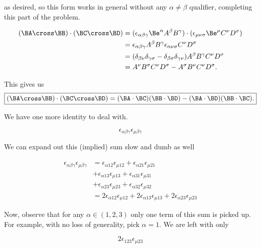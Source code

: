 as desired, so this form works in general without any $\alpha \ne \beta$ qualifier, completing this part of the problem.

\begin{align*}
(\BA \cross \BB) \cdot (\BC \cross \BD)
&=
(\epsilon_{\alpha \beta \gamma} \Be^\alpha A^\beta B^\gamma ) \cdot
(\epsilon_{\mu \nu \sigma} \Be^\mu C^\nu D^\sigma ) \\
&=
\epsilon_{\alpha \beta \gamma} A^\beta B^\gamma
\epsilon_{\alpha \nu \sigma} C^\nu D^\sigma \\
&=
(
\delta_{\beta \nu} \delta_{\gamma\sigma}
-\delta_{\beta \sigma} \delta_{\gamma\nu} )
A^\beta B^\gamma
C^\nu D^\sigma \\
&=
A^\nu B^\sigma
C^\nu D^\sigma
-A^\sigma B^\nu
C^\nu D^\sigma.
\end{align*}

This gives us
\begin{equation}\label{eqn:relElectroDynProblemSet3:190}
\boxed{
(\BA \cross \BB) \cdot (\BC \cross \BD)
=
(\BA \cdot \BC)
(\BB \cdot \BD)
-
(\BA \cdot \BD)
(\BB \cdot \BC).
}
\end{equation}

We have one more identity to deal with.

\begin{equation}\label{eqn:relElectroDynProblemSet3:210}
\epsilon_{\alpha \beta \gamma}
\epsilon_{\mu \beta \gamma}
\end{equation}

We can expand out this (implied) sum slow and dumb as well

\begin{align*}
\epsilon_{\alpha \beta \gamma}
\epsilon_{\mu \beta \gamma}
&=
\epsilon_{\alpha 1 2} \epsilon_{\mu 1 2}
+\epsilon_{\alpha 2 1} \epsilon_{\mu 2 1} \\
&+\epsilon_{\alpha 1 3} \epsilon_{\mu 1 3}
+\epsilon_{\alpha 3 1} \epsilon_{\mu 3 1} \\
&+\epsilon_{\alpha 2 3} \epsilon_{\mu 2 3}
+\epsilon_{\alpha 3 2} \epsilon_{\mu 3 2} \\
&=
2 \epsilon_{\alpha 1 2} \epsilon_{\mu 1 2}
+ 2 \epsilon_{\alpha 1 3} \epsilon_{\mu 1 3}
+ 2 \epsilon_{\alpha 2 3} \epsilon_{\mu 2 3}
\end{align*}

Now, observe that for any $\alpha \in (1,2,3)$ only one term of this sum is picked up.  For example, with no loss of generality, pick $\alpha = 1$.  We are left with only

\begin{equation}\label{eqn:relElectroDynProblemSet3:230}
2 \epsilon_{1 2 3} \epsilon_{\mu 2 3}
\end{equation}

